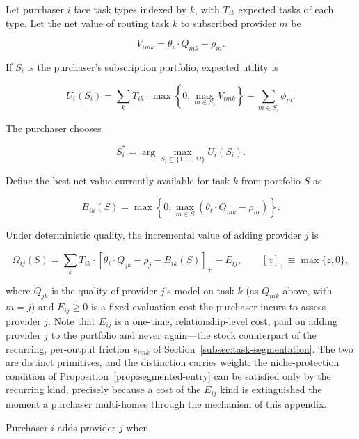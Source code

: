 \documentclass[11pt]{article}
\begin{document}
Let purchaser $i$ face task types indexed by $k$, with $T_{ik}$ expected tasks of each type. Let the net value of routing task $k$ to subscribed provider $m$ be

\begin{equation}V_{imk}=\theta_i\cdot Q_{mk}-\rho_m.\end{equation}

If $S_i$ is the purchaser's subscription portfolio, expected utility is

\begin{equation}U_i(S_i)=\sum_k T_{ik}\cdot\max\left\{0,\max_{m\in S_i}V_{imk}\right\}-\sum_{m\in S_i}\phi_m.\end{equation}

The purchaser chooses

\begin{equation}S_i^*=\arg\max_{S_i\subseteq\{1,\ldots,M\}}U_i(S_i).\end{equation}

Define the best net value currently available for task $k$ from portfolio $S$ as

\begin{equation}B_{ik}(S)=\max\left\{0,\max_{m\in S}\left(\theta_i\cdot Q_{mk}-\rho_m\right)\right\}.\end{equation}

Under deterministic quality, the incremental value of adding provider $j$ is

\begin{equation}\Omega_{ij}(S)=\sum_k T_{ik}\cdot\left[\theta_i\cdot Q_{jk}-\rho_j-B_{ik}(S)\right]_+-E_{ij},\qquad [z]_+\equiv\max\{z,0\},\end{equation}

where $Q_{jk}$ is the quality of provider $j$'s model on task $k$ (as $Q_{mk}$ above, with $m=j$) and $E_{ij}\geq0$ is a fixed evaluation cost the purchaser incurs to assess provider $j$. Note that $E_{ij}$ is a one-time, relationship-level cost, paid on adding provider $j$ to the portfolio and never again---the stock counterpart of the recurring, per-output friction $s_{imk}$ of Section~\ref{subsec:task-segmentation}. The two are distinct primitives, and the distinction carries weight: the niche-protection condition of Proposition~\ref{prop:segmented-entry} can be satisfied only by the recurring kind, precisely because a cost of the $E_{ij}$ kind is extinguished the moment a purchaser multi-homes through the mechanism of this appendix.

Purchaser $i$ adds provider $j$ when
\end{document}
